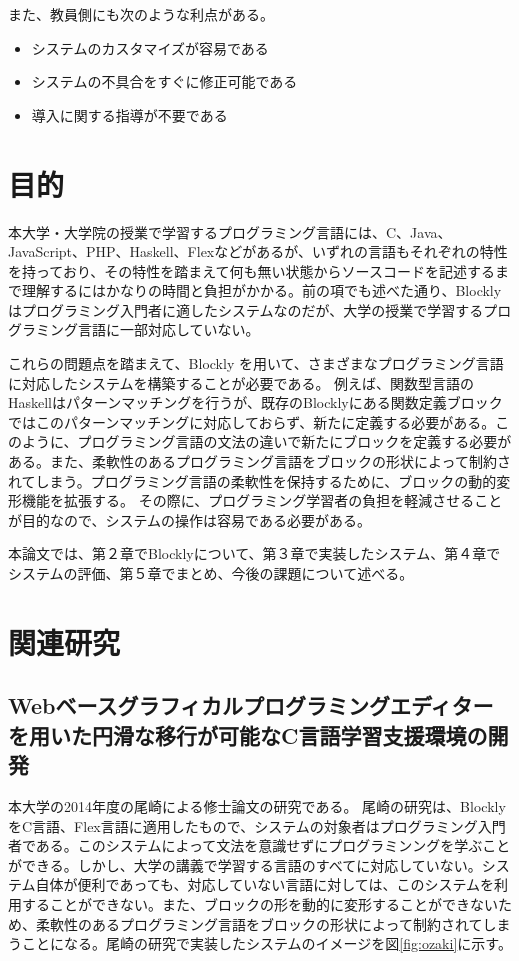 \documentclass{risepaper}
\begin{document}
また、教員側にも次のような利点がある。

\begin{itemize}
\item システムのカスタマイズが容易である
\item システムの不具合をすぐに修正可能である
\item 導入に関する指導が不要である
\end{itemize} 
 
     \section{目的}

本大学・大学院の授業で学習するプログラミング言語には、C、Java、JavaScript、PHP、Haskell、Flexなどがあるが、いずれの言語もそれぞれの特性を持っており、その特性を踏まえて何も無い状態からソースコードを記述するまで理解するにはかなりの時間と負担がかかる。前の項でも述べた通り、Blocklyはプログラミング入門者に適したシステムなのだが、大学の授業で学習するプログラミング言語に一部対応していない。

これらの問題点を踏まえて、Blockly を用いて、さまざまなプログラミング言語に対応したシステムを構築することが必要である。
例えば、関数型言語のHaskellはパターンマッチングを行うが、既存のBlocklyにある関数定義ブロックではこのパターンマッチングに対応しておらず、新たに定義する必要がある。このように、プログラミング言語の文法の違いで新たにブロックを定義する必要がある。また、柔軟性のあるプログラミング言語をブロックの形状によって制約されてしまう。プログラミング言語の柔軟性を保持するために、ブロックの動的変形機能を拡張する。
その際に、プログラミング学習者の負担を軽減させることが目的なので、システムの操作は容易である必要がある。

本論文では、第２章でBlocklyについて、第３章で実装したシステム、第４章でシステムの評価、第５章でまとめ、今後の課題について述べる。
 
    \section{関連研究}
    
    \subsection{Webベースグラフィカルプログラミングエディターを用いた円滑な移行が可能なC言語学習支援環境の開発}
 
 本大学の2014年度の尾崎による修士論文\cite{ozaki}の研究である。
 尾崎の研究は、BlocklyをC言語、Flex言語に適用したもので、システムの対象者はプログラミング入門者である。このシステムによって文法を意識せずにプログラミンングを学ぶことができる。しかし、大学の講義で学習する言語のすべてに対応していない。システム自体が便利であっても、対応していない言語に対しては、このシステムを利用することができない。また、ブロックの形を動的に変形することができないため、柔軟性のあるプログラミング言語をブロックの形状によって制約されてしまうことになる。尾崎の研究で実装したシステムのイメージを図\ref{fig:ozaki}に示す。 
\end{document}
